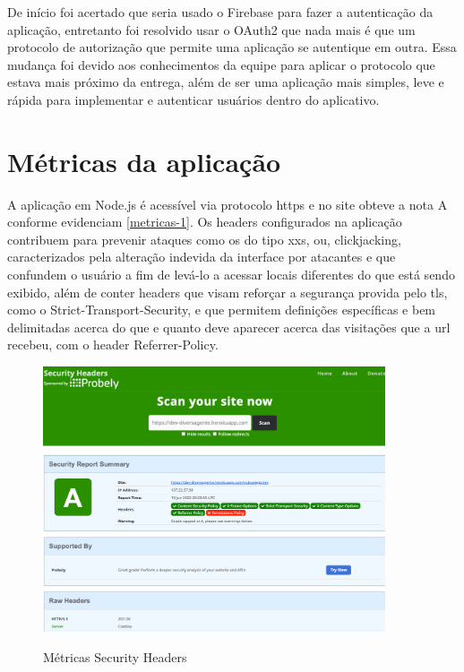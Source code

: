 De início foi acertado que seria usado o Firebase para fazer a autenticação da aplicação, entretanto foi resolvido usar o OAuth2 que nada mais é que um protocolo de autorização que permite uma aplicação se autentique em outra. Essa mudança foi devido aos conhecimentos da equipe para aplicar o protocolo que estava mais próximo da entrega, além de ser uma aplicação mais simples, leve e rápida para implementar e autenticar usuários dentro do aplicativo. 
 
\section{Métricas da aplicação}

A aplicação em Node.js é acessível via protocolo \ac{https} e no site   obteve a nota A conforme evidenciam \autoref{metricas-1}. Os headers configurados na aplicação contribuem para prevenir ataques como os do tipo \ac{xxs}, ou, clickjacking,  caracterizados pela alteração indevida da interface por atacantes e que confundem o usuário a fim de levá-lo a acessar locais diferentes do que está sendo exibido, além de conter headers que visam reforçar a segurança provida pelo \ac{tls}, como o Strict-Transport-Security, e que permitem definições específicas e bem delimitadas acerca do que e quanto deve aparecer acerca das visitações que a \ac{url} recebeu, com o header Referrer-Policy. 

\begin{figure}[h]
	\centering
	\caption{\label{fig_arq_virado}Métricas Security Headers}
	\includegraphics[width=0.90\textwidth]{anexos/metricas1.png}
	\label{metricas-1}
\end{figure}


